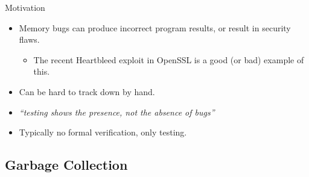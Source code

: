 \documentclass[usenames,dvipsnames]{beamer}
\begin{document}
\begin{frame}{Motivation}
  \begin{itemize}
  \item Memory bugs can produce incorrect program results, or result
    in security flaws.
    \begin{itemize}
    \item The recent Heartbleed exploit in OpenSSL is a good (or bad)
      example of this.
    \end{itemize}
  \item Can be hard to track down by hand.
  \item \textit{``testing shows the presence, not the absence of
      bugs''}
  \item Typically no formal verification, only testing.
  \end{itemize}


\end{frame}

\subsection{Garbage Collection}
\end{document}
